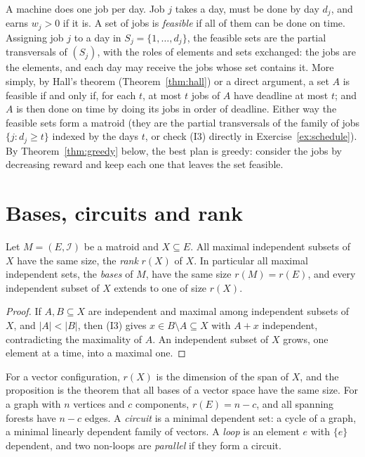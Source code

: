 \begin{example}\label{exa:scheduling}
A machine does one job per day. Job $j$ takes a day, must be done by day $d_j$, and earns $w_j>0$ if it is. A set of jobs is \emph{feasible} if all of them can be done on time. Assigning
job $j$ to a day in $S_j=\{1,\dots,d_j\}$, the feasible sets are the partial transversals of $(S_j)$, with the roles of elements and sets exchanged: the jobs are the elements, and each day may
receive the jobs whose set contains it. More simply, by Hall's theorem (Theorem~\ref{thm:hall}) or a direct argument, a set $A$ is feasible if and only if, for each $t$, at most $t$ jobs of
$A$ have deadline at most $t$; and $A$ is then done on time by doing its jobs in order of deadline. Either way the feasible sets form a matroid (they are the partial transversals of the
family of jobs $\{j:d_j\ge t\}$ indexed by the days $t$, or check (I3) directly in Exercise~\ref{ex:schedule}). By Theorem~\ref{thm:greedy} below, the best plan is greedy: consider the jobs by decreasing
reward and keep each one that leaves the set feasible.
\end{example}

\section{Bases, circuits and rank}

\begin{proposition}\label{prop:bases}
Let $M=(E,\mathcal I)$ be a matroid and $X\subseteq E$. All maximal independent subsets of $X$ have the same size, the \emph{rank} $r(X)$ of $X$. In particular all maximal independent sets, the
\emph{bases} of $M$, have the same size $r(M)=r(E)$, and every independent subset of $X$ extends to one of size $r(X)$.
\end{proposition}
\begin{proof}
If $A,B\subseteq X$ are independent and maximal among independent subsets of $X$, and $|A|<|B|$, then (I3) gives $x\in B\setminus A\subseteq X$ with $A+x$ independent, contradicting the maximality of $A$. An
independent subset of $X$ grows, one element at a time, into a maximal one.
\end{proof}

For a vector configuration, $r(X)$ is the dimension of the span of $X$, and the proposition is the theorem that all bases of a vector space have the same size. For a graph with $n$ vertices and $c$
components, $r(E)=n-c$, and all spanning forests have $n-c$ edges. A \emph{circuit} is a minimal dependent set: a cycle of a graph, a minimal linearly dependent family of vectors. A \emph{loop} is an
element $e$ with $\{e\}$ dependent, and two non-loops are \emph{parallel} if they form a circuit.

